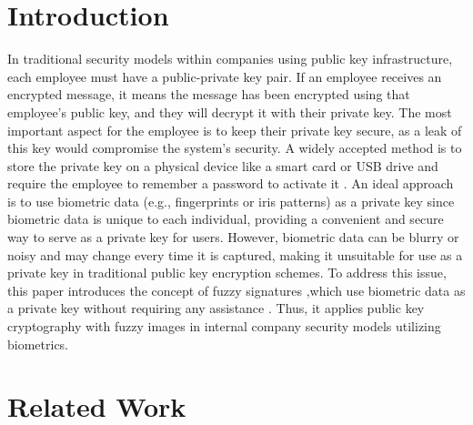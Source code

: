 \documentclass[graybox]{svmult}
\begin{document}

\section{Introduction}
In traditional security models within companies using public key infrastructure, each employee must have a public-private key pair. If an employee receives an encrypted message, it means the message has been encrypted using that employee's public key, and they will decrypt it with their private key. The most important aspect for the employee is to keep their private key secure, as a leak of this key would compromise the system's security. A widely accepted method is to store the private key on a physical device like a smart card or USB drive and require the employee to remember a password to activate it
\parencite{Ellison2000}.
An ideal approach is to use biometric data (e.g., fingerprints or iris patterns)
\parencite{Connaughton2007}
as a private key since biometric data is unique to each individual, providing a convenient and secure way to serve as a private key for users. However, biometric data can be blurry or noisy and may change every time it is captured, making it unsuitable for use as a private key in traditional public key encryption schemes.
To address this issue, this paper introduces the concept of fuzzy signatures
\parencite{Takahashi2015}
,which use biometric data as a private key without requiring any assistance
\parencite{Dodis2008}
. Thus, it applies public key cryptography with fuzzy images
\parencite{Son2016}
in internal company security models utilizing biometrics.

\section{Related Work}
\end{document}
